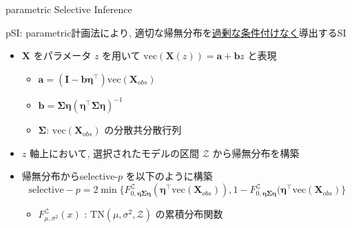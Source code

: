 \documentclass[dvipdfmx, 10pt]{beamer}
\newcommand{\ul}{\underline}
\begin{document}

\begin{frame}{parametric Selective Inference}

    pSI: parametric計画法により, 適切な帰無分布を\ul{過剰な条件付けなく}導出するSI
    \begin{itemize}
        \item $\bm{X}$ をパラメータ $z$ を用いて $\mathrm{vec}(\bm{X}(z)) = \bm{a} + \bm{b} z$ と表現
        \begin{itemize}
            \item $\bm{a} = (\bm{I} - \bm{b} \bm{\eta}^{\top}) \mathrm{vec}(\bm{X}_{obs})$
            \item $\bm{b} = \bm{\Sigma} \bm{\eta} (\bm{\eta}^{\top} \bm{\Sigma} \bm{\eta})^{-1}$
            \item $\bm{\Sigma}$: $\mathrm{vec}(\bm{X}_{obs})$ の分散共分散行列
        \end{itemize}
        \item  $z$ 軸上において, 選択されたモデルの区間 $\mathcal{Z}$ から帰無分布を構築
        \item 帰無分布からselective-$p$ を以下のように構築
        \[
            \mathrm{selective-}p = 2 \min \{
                F_{0, \bm{\eta} \bm{\Sigma} \bm{\eta}}^{\mathcal{Z}} (\bm{\eta}^{\top} \mathrm{vec}(\bm{X}_{obs})),
                1 - F_{0, \bm{\eta} \bm{\Sigma} \bm{\eta}}^{\mathcal{Z}} (\bm{\eta}^{\top} \mathrm{vec}(\bm{X}_{obs})
            \}
        \]
        \begin{itemize}
            \item $F_{\mu, \sigma^2}^{\mathcal{Z}}(x)$ : $\mathrm{T}\mathrm{N}(\mu, \sigma^2, \mathcal{Z})$ の累積分布関数
        \end{itemize}
    \end{itemize}

\end{frame}

\end{document}
